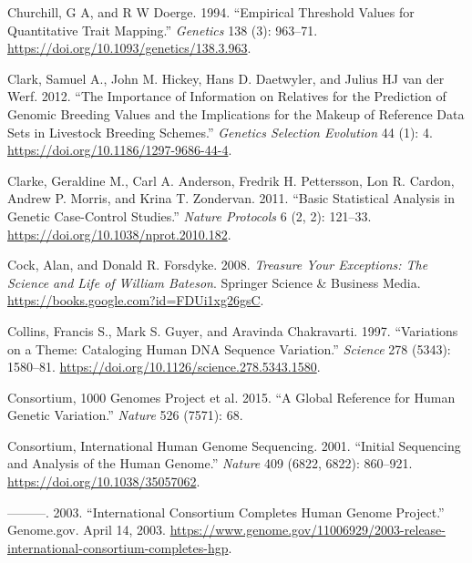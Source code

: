 \documentclass[
]{book}
\newlength{\cslhangindent}
\newlength{\cslentryspacingunit} %
\newenvironment{CSLReferences}[2] %
 {%
  \setlength{\parindent}{0pt}
  \ifodd #1
  \let\oldpar\par
  \def\par{\hangindent=\cslhangindent\oldpar}
  \fi
  \setlength{\parskip}{#2\cslentryspacingunit}
 }%
 {}
\begin{document}
\begin{CSLReferences}{1}{0}
\leavevmode{}%
Churchill, G A, and R W Doerge. 1994. {``Empirical Threshold Values for Quantitative Trait Mapping.''} \emph{Genetics} 138 (3): 963--71. \url{https://doi.org/10.1093/genetics/138.3.963}.

\leavevmode{}%
Clark, Samuel A., John M. Hickey, Hans D. Daetwyler, and Julius HJ van der Werf. 2012. {``The Importance of Information on Relatives for the Prediction of Genomic Breeding Values and the Implications for the Makeup of Reference Data Sets in Livestock Breeding Schemes.''} \emph{Genetics Selection Evolution} 44 (1): 4. \url{https://doi.org/10.1186/1297-9686-44-4}.

\leavevmode{}%
Clarke, Geraldine M., Carl A. Anderson, Fredrik H. Pettersson, Lon R. Cardon, Andrew P. Morris, and Krina T. Zondervan. 2011. {``Basic Statistical Analysis in Genetic Case-Control Studies.''} \emph{Nature Protocols} 6 (2, 2): 121--33. \url{https://doi.org/10.1038/nprot.2010.182}.

\leavevmode{}%
Cock, Alan, and Donald R. Forsdyke. 2008. \emph{Treasure {Your Exceptions}: {The Science} and {Life} of {William Bateson}}. {Springer Science \& Business Media}. \url{https://books.google.com?id=FDUi1xg26gsC}.

\leavevmode{}%
Collins, Francis S., Mark S. Guyer, and Aravinda Chakravarti. 1997. {``Variations on a {Theme}: {Cataloging Human DNA Sequence Variation}.''} \emph{Science} 278 (5343): 1580--81. \url{https://doi.org/10.1126/science.278.5343.1580}.

\leavevmode{}%
Consortium, 1000 Genomes Project et al. 2015. {``A Global Reference for Human Genetic Variation.''} \emph{Nature} 526 (7571): 68.

\leavevmode{}%
Consortium, International Human Genome Sequencing. 2001. {``Initial Sequencing and Analysis of the Human Genome.''} \emph{Nature} 409 (6822, 6822): 860--921. \url{https://doi.org/10.1038/35057062}.

\leavevmode{}%
---------. 2003. {``International {Consortium Completes Human Genome Project}.''} {Genome.gov}. April 14, 2003. \url{https://www.genome.gov/11006929/2003-release-international-consortium-completes-hgp}.


\end{CSLReferences}
\end{document}
